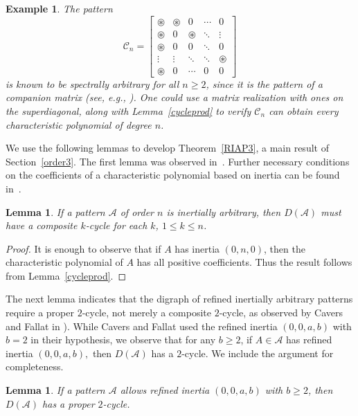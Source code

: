 \documentclass[10pt]{amsart}
\newtheorem{lemma}[proposition]{Lemma}
\newtheorem{example}[proposition]{Example}
\begin{document}
\begin{example}\label{Cn}
{\rm 
The pattern
$${\mathcal{C}}_n = \left[ \begin{array}{ccccc}
{\circledast} 	& {\circledast} 	& 0			& \cdots 	& 0\\
{\circledast} 	& 0     	& {\circledast}		& \ddots  	& \vdots\\
{\circledast} 	& 0     	& 0       	& \ddots	& 0\\
\vdots	& \vdots	& \ddots  	& \ddots 	& {\circledast} \\
{\circledast}	& 0		    & \cdots  	& 0  		& 0 \end{array} \right]$$
 is known to be spectrally arbitrary for all $n\geq 2$, since it is the pattern of a companion matrix
 (see, e.g., \cite{CF}).
 One could use a matrix realization with ones on the superdiagonal, along with Lemma~\ref{cycleprod}
 to verify ${\mathcal{C}}_n$ can obtain every characteristic polynomial of degree $n$.
}\end{example} 
  We use the following lemmas to develop Theorem~\ref{RIAP3}, a main result of Section~\ref{order3}.
The first lemma was observed in~\cite[Lemma 20]{KOV}. Further necessary conditions on the coefficients
of a characteristic polynomial based on inertia can be found in~\cite[Lemma 1]{CVV}.

\begin{lemma}\cite[Lemma 20]{KOV}\label{kcycle}
If a pattern ${\mathcal{A}}$ of order $n$ is inertially arbitrary, then $D({\mathcal{A}})$ must have a composite
$k$-cycle for each $k$, $1\leq k\leq n$. 
\end{lemma}

\begin{proof}
It is enough to observe that if $A$ has inertia $(0,n,0)$, then the characteristic polynomial
of $A$ has all positive coefficients. Thus the result follows from 
Lemma~\ref{cycleprod}.
\end{proof}

The next lemma indicates that the digraph of refined inertially arbitrary 
patterns require a proper $2$-cycle, not merely a composite $2$-cycle, 
as observed by Cavers and Fallat in \cite[Cor. 2.8]{CF}). 
While Cavers and Fallat used 
the refined inertia $(0,0,a,b)$ with
$b=2$ in their hypothesis, we observe that
for any $b\geq 2$, if $A\in{\mathcal{A}}$ has refined inertia $(0,0,a,b),$ then $D({\mathcal{A}})$ 
has a $2$-cycle. We include the
argument for completeness.

\begin{lemma}\label{2cycle}
If a pattern ${\mathcal{A}}$ allows refined inertia $(0,0,a,b)$ with $b\geq 2$, then $D({\mathcal{A}})$ has a proper $2$-cycle.
\end{lemma}
\end{document}
